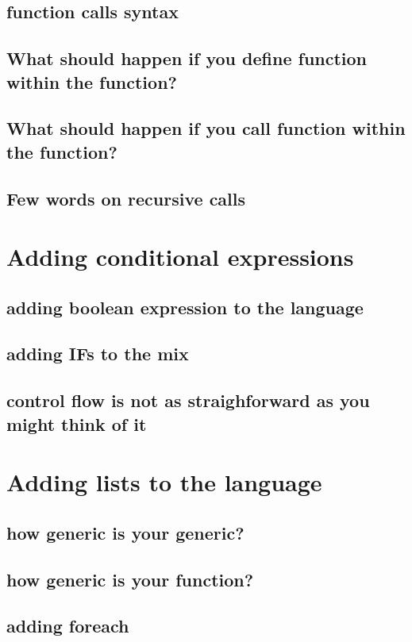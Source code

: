 \documentclass[11pt]{article}
\begin{document}
\subsection{function calls syntax}
\label{sec:org5547743}
\subsection{What should happen if you define function within the function?}
\label{sec:org942f7c9}
\subsection{What should happen if you call function within the function?}
\label{sec:org64c25fc}
\subsection{Few words on recursive calls}
\label{sec:orgae8abbe}
\section{Adding conditional expressions}
\label{sec:org602eeff}
\subsection{adding boolean expression to the language}
\label{sec:org7c969eb}
\subsection{adding IFs to the mix}
\label{sec:org4b2026e}
\subsection{control flow is not as straighforward as you might think of it}
\label{sec:org698d8b1}
\section{Adding lists to the language}
\label{sec:orgaf496db}
\subsection{how generic is your generic?}
\label{sec:orgac95476}
\subsection{how generic is your function?}
\label{sec:org529cd7b}
\subsection{adding foreach}
\label{sec:orgf213c01}
\end{document}
